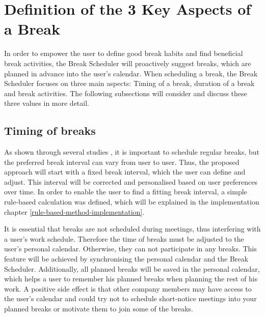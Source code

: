 \documentclass{hasel_thesis}
\begin{document}
\section{Definition of the 3 Key Aspects of a Break }
 In order to empower the user to define good break habits and find beneficial break activities, the Break Scheduler will proactively suggest breaks, which are planned in advance into the user's calendar. When scheduling a break, the Break Scheduler focuses on three main aspects: Timing of a break, duration of a break and break activities. The following subsections will consider and discuss these three values in more detail.

\subsection{Timing of breaks}
As shown through several studies \cite{Largo-Wight.2017} \cite{KimS.ParkY.&Niu.2017}, it is important to schedule regular breaks, but the preferred break interval can vary from user to user. Thus, the proposed approach will start with a fixed break interval, which the user can define and adjust. This interval will be corrected and personalised based on user preferences over time. In order to enable the user to find a fitting break interval, a simple rule-based calculation was defined, which will be explained in the implementation chapter \ref{rule-based-method-implementation}.

It is essential that breaks are not scheduled during meetings, thus interfering with a user's work schedule. Therefore the time of breaks must be adjusted to the user's personal calendar. Otherwise, they can not participate in any breaks. This feature will be achieved by synchronising the personal calendar and the Break Scheduler. Additionally, all planned breaks will be saved in the personal calendar, which helps a user to remember his planned breaks when planning the rest of his work. A positive side effect is that other company members may have access to the user's calendar and could try not to schedule short-notice meetings into your planned breaks or motivate them to join some of the breaks.
\end{document}

